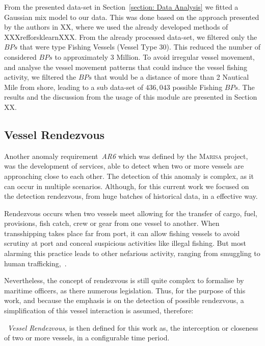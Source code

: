  
From the presented data-set in Section~\ref{section: Data Analysis} we fitted a Gaussian mix model to our data. This was done based on the approach presented by the authors in XX,  where we used the already developed methods of XXXrefforsklearnXXX. From the already  processed data-set, we filtered only the $BPs$ that were type Fishing Vessels (Vessel Type 30). This reduced the number of considered $BPs$ to approximately 3 Million. To avoid irregular vessel movement, and analyse the vessel movement patterns that could induce the vessel fishing activity, we filtered the $BPs$ that would be a distance of more than 2 Nautical Mile from shore, leading to a sub data-set of $436,043$ possible Fishing $BPs$.
The results and the discussion from the usage of this module are presented in Section XX.

\subsection{Vessel Rendezvous}
\label{subsection: 4 Vessel Rendezvous}
Another anomaly requirement~\emph{AR6} which was defined by the \textsc{Marisa} project, was the development of services, able to detect when two or more vessels are approaching close to each other. The detection of this anomaly is complex, as it can occur in multiple scenarios. Although, for this current work we focused on the detection rendezvous, from huge batches of historical data, in a effective way. 

Rendezvous occurs when two vessels meet allowing for the transfer of cargo, fuel, provisions, fish catch, crew or gear from one vessel to another. When transshipping takes place far from port, it can allow fishing vessels to avoid scrutiny at port and conceal suspicious activities like illegal fishing. But most alarming this practice leads to other nefarious activity, ranging from smuggling to human trafficking,~\cite{Miller2018IdentifyingBehavior}.

Nevertheless, the concept of rendezvous is still quite complex to formalise by maritime officers, as there numerous legislation. Thus, for the purpose of this work, and because the emphasis is on the detection of possible rendezvous, a simplification of this vessel interaction is assumed, therefore: 

~\emph{Vessel Rendezvous}, is then defined for this work as, the interception or closeness of two or more vessels, in a configurable time period.


